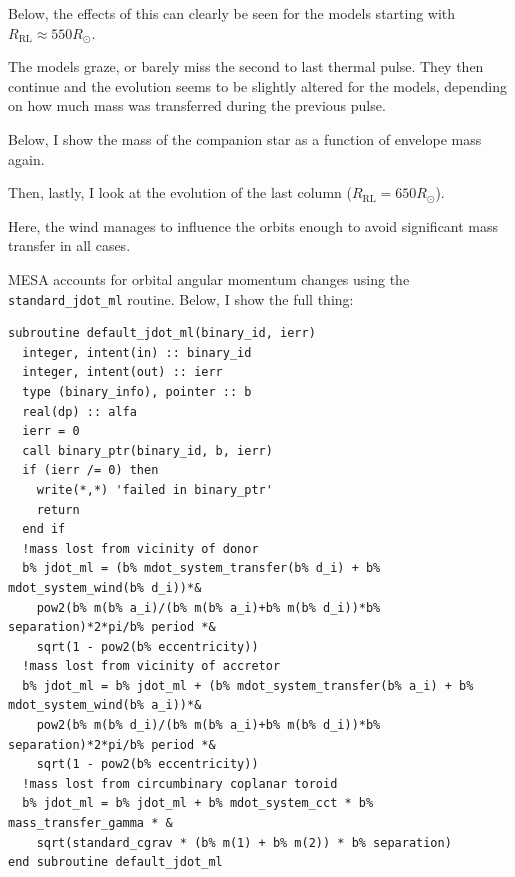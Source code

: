 \documentclass[a4paper,10pt]{article}
\begin{document}
Below, the effects of this can clearly be seen for the models starting with \(R_\text{RL} \approx 550R_\odot \).
\begin{figure}[ht]
    \centering
\end{figure}

The models graze, or barely miss the second to last thermal pulse. They then continue and the evolution seems to be slightly altered for the models, depending on how much mass was transferred during the previous pulse.

Below, I show the mass of the companion star as a function of envelope mass again.

\begin{figure}[ht]
    \centering
\end{figure}

Then, lastly, I look at the evolution of the last column (\(R_\text{RL} = 650R_\odot \)).
\begin{figure}[ht]
    \centering
\end{figure}

Here, the wind manages to influence the orbits enough to avoid significant mass transfer in all cases.




MESA accounts for orbital angular momentum changes using the \lstinline[style=output, breaklines=true]|standard_jdot_ml| routine. Below, I show the full thing:

\begin{verbatim}
subroutine default_jdot_ml(binary_id, ierr)
  integer, intent(in) :: binary_id
  integer, intent(out) :: ierr
  type (binary_info), pointer :: b
  real(dp) :: alfa
  ierr = 0
  call binary_ptr(binary_id, b, ierr)
  if (ierr /= 0) then
    write(*,*) 'failed in binary_ptr'
    return
  end if
  !mass lost from vicinity of donor
  b% jdot_ml = (b% mdot_system_transfer(b% d_i) + b% mdot_system_wind(b% d_i))*&
    pow2(b% m(b% a_i)/(b% m(b% a_i)+b% m(b% d_i))*b% separation)*2*pi/b% period *&
    sqrt(1 - pow2(b% eccentricity))
  !mass lost from vicinity of accretor
  b% jdot_ml = b% jdot_ml + (b% mdot_system_transfer(b% a_i) + b% mdot_system_wind(b% a_i))*&
    pow2(b% m(b% d_i)/(b% m(b% a_i)+b% m(b% d_i))*b% separation)*2*pi/b% period *&
    sqrt(1 - pow2(b% eccentricity))
  !mass lost from circumbinary coplanar toroid
  b% jdot_ml = b% jdot_ml + b% mdot_system_cct * b% mass_transfer_gamma * &
    sqrt(standard_cgrav * (b% m(1) + b% m(2)) * b% separation)
end subroutine default_jdot_ml
\end{verbatim}
\end{document}
